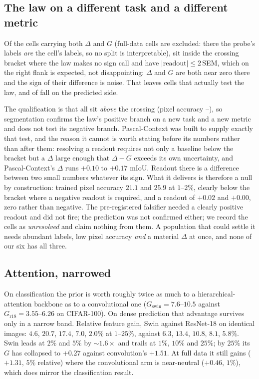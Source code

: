 \subsection{The law on a different task and a different metric}
Of the \denseLawCells{} cells carrying both $\Delta$ and $G$ (full-data cells
are excluded: there the probe's labels \emph{are} the cell's labels, so no
split is interpretable), \denseLawBracket{} sit inside the crossing bracket
where the law makes no sign call and \denseLawUnres{} have
$|\mathrm{readout}| \leq 2$\,SEM, which on the right flank is expected, not disappointing: $\Delta$ and $G$ are both near zero there and the sign of
their difference is noise. That leaves \denseLawResolvable{} cells that
actually test the law, and \denseLawCorrect{} of \denseLawResolvable{} fall
on the predicted side.

 The qualification is that all \denseLawResolvable{} sit
\emph{above} the crossing (pixel accuracy \denseLawPixLo--\denseLawPixHi),
so segmentation confirms the law's positive branch on a new task and a new
metric and does not test its negative branch. Pascal-Context was built to
supply exactly that test, and the reason it cannot is worth stating before
its numbers rather than after them: resolving a readout requires not only a
baseline below the bracket but a $\Delta$ large enough that
$\Delta - G$ exceeds its own uncertainty, and Pascal-Context's $\Delta$ runs
$+0.10$ to $+0.17$ mIoU. Readout there is a difference between two small
numbers whatever its sign. What it delivers is therefore a null by
construction: trained pixel accuracy $21.1$ and $25.9$ at $1$--$2\%$,
clearly below the bracket where a negative readout is required, and a readout
of $+0.02$ and $+0.00$, zero rather than negative. The pre-registered falsifier
needed a clearly positive readout and did not fire; the prediction was not
confirmed either; we record the cells as \emph{unresolved} and claim nothing
from them. A population that could settle it needs abundant labels, low pixel
accuracy \emph{and} a material $\Delta$ at once, and none of our six has all
three.

\subsection{Attention, narrowed}\label{sec:denseattn}
On classification the prior is worth roughly twice as much to a
hierarchical-attention backbone as to a convolutional one
($G_{\mathrm{swin}} = 7.6$--$10.5$ against $G_{\mathrm{r18}} = 3.55$--$6.26$
on CIFAR-100). On dense prediction that advantage survives only in a narrow
band. Relative feature gain, Swin against ResNet-18 on identical images:
$4.6$, $20.7$, $17.4$, $7.0$, $2.0\%$ at $1$--$25\%$, against
$6.3$, $13.4$, $10.8$, $8.1$, $5.8\%$. Swin leads at $2\%$ and $5\%$ by
${\sim}1.6\times$ and trails at $1\%$, $10\%$ and $25\%$; by $25\%$ its $G$
has collapsed to $+0.27$ against convolution's $+1.51$. At full data it still
gains ($+1.31$, $5\%$ relative) where the convolutional arm is
near-neutral ($+0.46$, $1\%$), which does mirror the classification result.

